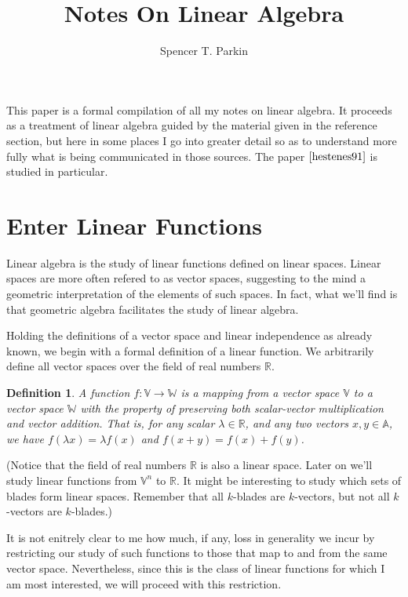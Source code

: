 \documentclass[12pt]{article}
\title{Notes On Linear Algebra}
\author{Spencer T. Parkin}
\newcommand{\V}{\mathbb{V}}
\newcommand{\W}{\mathbb{W}}
\newcommand{\R}{\mathbb{R}}
\newcommand{\A}{\mathbb{A}}
\newtheorem{definition}{Definition}[section]
\begin{document}
\maketitle

This paper is a formal compilation of all my notes on linear algebra.
It proceeds as a treatment of linear algebra guided by the material
given in the reference section, but here in some places I go into greater detail so as
to understand more fully what is being communicated in those sources.
The paper $\cite{hestenes91}$ is studied in particular.
\nocite{macdonald12}
\nocite{hestenes85}

\section{Enter Linear Functions}

Linear algebra is the study of linear functions defined on linear spaces.
Linear spaces are more often refered to as vector spaces, suggesting
to the mind a geometric interpretation of the elements of such spaces.
In fact, what we'll find is that geometric algebra facilitates the study
of linear algebra.

Holding the definitions of a vector space and linear independence as
already known, we begin with a formal definition of a linear function.
We arbitrarily define all vector spaces over the field of real numbers $\R$.
\begin{definition}
A function $f:\V\to\W$ is a mapping from a vector space $\V$ to
a vector space $\W$ with the property of preserving both scalar-vector
multiplication and vector addition.  That is, for any scalar $\lambda\in\R$,
and any two vectors $x,y\in\A$, we have $f(\lambda x)=\lambda f(x)$ and
$f(x+y)=f(x)+f(y)$.
\end{definition}
(Notice that the field of real numbers $\R$ is also a linear space.  Later on
we'll study linear functions from $\V^n$ to $\R$.  It might be interesting
to study which sets of blades form linear spaces.
Remember that all $k$-blades are $k$-vectors, but not all $k$-vectors are $k$-blades.)

It is not enitrely clear to me how much, if any, loss in generality we incur
by restricting our study of such functions to those that map to and from
the same vector space.  Nevertheless, since this is the class of linear
functions for which I am most interested, we will proceed with this restriction.
\end{document}
